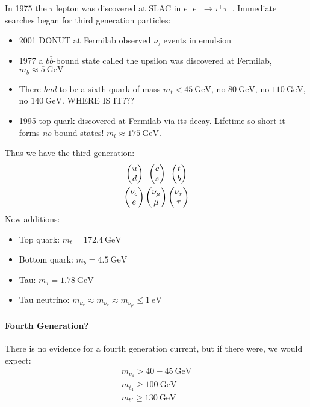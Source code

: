 In 1975 the $\tau$ lepton was discovered at SLAC in $e^+e^-\to\tau^+\tau^-$. Immediate searches began for third generation particles:
\begin{itemize}
\item 2001 DONUT at Fermilab observed $\nu_\tau$ events in emulsion
\item 1977 a $b\bar{b}$-bound state called the upsilon was discovered at Fermilab, $m_b\approx\SI{5}{\GeV}$
\item There \emph{had} to be a sixth quark of mass $m_t<\SI{45}{\GeV}$, no $\SI{80}{\GeV}$, no $\SI{110}{\GeV}$, no $\SI{140}{\GeV}$. WHERE IS IT???
\item 1995 top quark discovered at Fermilab via its decay. Lifetime so short it forms \emph{no} bound states! $m_t\approx\SI{175}{\GeV}$. 
\end{itemize}
Thus we have the third generation:
\begin{gather*}
  \pmqty{u\\d}\hspace{0.5em}\pmqty{c\\s}\hspace{0.5em}\pmqty{t\\b}\\
  \pmqty{\nu_e\\e}\pmqty{\nu_\mu\\\mu}\pmqty{\nu_\tau\\\tau}
\end{gather*}
New additions:
\begin{itemize}
\item Top quark: $m_t=\SI{172.4}{\GeV}$
\item Bottom quark: $m_b=\SI{4.5}{\GeV}$
\item Tau: $m_\tau=\SI{1.78}{\GeV}$
\item Tau neutrino: $m_{\nu_\tau}\approx m_{\nu_e}\approx m_{\nu_\mu}\leq \SI{1}{\eV}$
\end{itemize}

\paragraph{Fourth Generation?}

There is no evidence for a fourth generation current, but if there were, we would expect:
\begin{gather*}
  m_{\nu_4}>40-\SI{45}{\GeV}\\
  m_{\ell_4}\geq\SI{100}{\GeV}\\
  m_{b'}\geq\SI{130}{\GeV}
\end{gather*}

